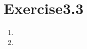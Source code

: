 \documentclass[paper=a4, fontsize=11pt]{scrartcl} %
\numberwithin{equation}{section} %
\numberwithin{figure}{section} %
\numberwithin{table}{section} %
\begin{document}
\section{Exercise3.3}
	\begin{enumerate}
		\item 
		
		\item 
		
	\end{enumerate}
\end{document}
